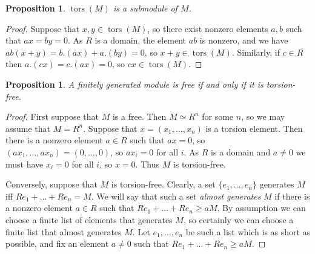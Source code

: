 \documentclass{amsart}
\newcommand{\tors}      {\operatorname{tors}}
\renewcommand{\:}{\colon}
\newtheorem{proposition}[theorem]{Proposition}
\theoremstyle{definition}
\begin{document}
\begin{proposition}\label{prop-tors-submodule}
 $\tors(M)$ is a submodule of $M$.
\end{proposition}
\begin{proof}
 Suppose that $x,y\in\tors(M)$, so there exist nonzero elements $a,b$
 such that $ax=by=0$.  As $R$ is a domain, the element $ab$ is
 nonzero, and we have $ab(x+y)=b.(ax)+a.(by)=0$, so $x+y\in\tors(M)$.
 Similarly, if $c\in R$ then $a.(cx)=c.(ax)=0$, so $cx\in\tors(M)$.
\end{proof}

\begin{proposition}\label{prop-tors-free-free}
 A finitely generated module is free if and only if it is
 torsion-free. 
\end{proposition}
\begin{proof}
 First suppose that $M$ is a free.  Then $M\simeq R^n$ for some $n$,
 so we may assume that $M=R^n$.  Suppose that $x=(x_1,\ldots,x_n)$ is
 a torsion element.  Then there is a nonzero element $a\in R$ such
 that $ax=0$, so $(ax_1,\ldots,ax_n)=(0,\ldots,0)$, so $ax_i=0$ for
 all $i$.  As $R$ is a domain and $a\neq 0$ we must have $x_i=0$ for
 all $i$, so $x=0$.  Thus $M$ is torsion-free.

 Conversely, suppose that $M$ is torsion-free.  Clearly, a set
 $\{e_1,\ldots,e_n\}$ generates $M$ iff $Re_1+\ldots+Re_n=M$.  We will
 say that such a set \emph{almost generates} $M$ if there is a nonzero
 element $a\in R$ such that $Re_1+\ldots+Re_n\geq aM$.  By assumption
 we can choose a finite list of elements that generates $M$, so
 certainly we can choose a finite list that almost generates $M$.  Let
 $e_1,\ldots,e_n$ be such a list which is as short as possible, and
 fix an element $a\neq 0$ such that $Re_1+\ldots+Re_n\geq aM$.  


\end{proof}
\end{document}
